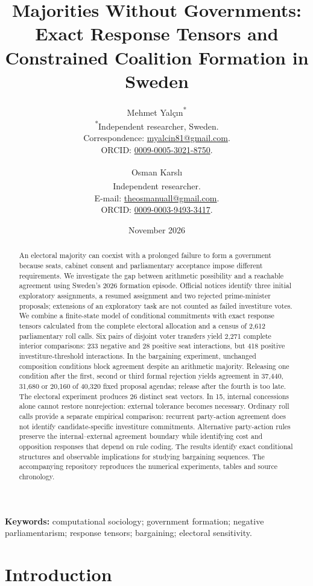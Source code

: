 \documentclass[11pt,a4paper]{article}
\title{Majorities Without Governments:\\Exact Response Tensors and Constrained Coalition Formation in Sweden}
\author{Mehmet Yal\c{c}{\i}n\textsuperscript{*}\\[-.35em]
{\fontsize{8}{10}\selectfont\textsuperscript{*}Independent researcher, Sweden.}\\[-.35em]
{\fontsize{8}{10}\selectfont Correspondence: \href{mailto:myalcin81@gmail.com}{myalcin81@gmail.com}.}\\[-.35em]
{\fontsize{8}{10}\selectfont ORCID: \href{https://orcid.org/0009-0005-3021-8750}{0009-0005-3021-8750}.}
\and Osman Karsl{\i}\textsuperscript{\textdagger}\\[-.35em]
{\fontsize{8}{10}\selectfont\textsuperscript{\textdagger}Independent researcher.}\\[-.35em]
{\fontsize{8}{10}\selectfont E-mail: \href{mailto:theosmanuall@gmail.com}{theosmanuall@gmail.com}.}\\[-.35em]
{\fontsize{8}{10}\selectfont ORCID: \href{https://orcid.org/0009-0003-9493-3417}{0009-0003-9493-3417}.}}
\date{November 2026}
\begin{document}
\maketitle
\begin{abstract}
An electoral majority can coexist with a prolonged failure to form a government because seats, cabinet consent and parliamentary acceptance impose different requirements. We investigate the gap between arithmetic possibility and a reachable agreement using Sweden's 2026 formation episode. Official notices identify three initial exploratory assignments, a resumed assignment and two rejected prime-minister proposals; extensions of an exploratory task are not counted as failed investiture votes. We combine a finite-state model of conditional commitments with exact response tensors calculated from the complete electoral allocation and a census of 2,612 parliamentary roll calls. Six pairs of disjoint voter transfers yield 2,271 complete interior comparisons: 233 negative and 28 positive seat interactions, but 418 positive investiture-threshold interactions. In the bargaining experiment, unchanged composition conditions block agreement despite an arithmetic majority. Releasing one condition after the first, second or third formal rejection yields agreement in 37,440, 31,680 or 20,160 of 40,320 fixed proposal agendas; release after the fourth is too late. The electoral experiment produces 26 distinct seat vectors. In 15, internal concessions alone cannot restore nonrejection: external tolerance becomes necessary. Ordinary roll calls provide a separate empirical comparison: recurrent party-action agreement does not identify candidate-specific investiture commitments. Alternative party-action rules preserve the internal--external agreement boundary while identifying cost and opposition responses that depend on rule coding. The results identify exact conditional structures and observable implications for studying bargaining sequences. The accompanying repository reproduces the numerical experiments, tables and source chronology.
\end{abstract}
\noindent\textbf{Keywords:} computational sociology; government formation; negative parliamentarism; response tensors; bargaining; electoral sensitivity.

\section{Introduction}
\end{document}
